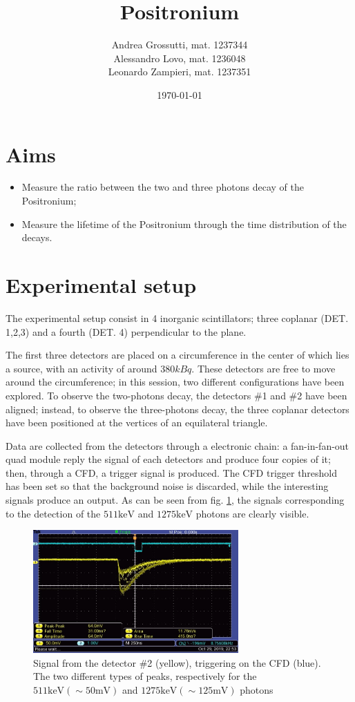\documentclass[11pt,a4 paper]{article}
\title{Positronium}
\author{Andrea Grossutti, mat. 1237344\\Alessandro Lovo, mat. 1236048\\Leonardo Zampieri, mat. 1237351}
\date{\today}
\begin{document}
\maketitle

\section{Aims}
\begin{itemize}
    \item Measure the ratio between the two and three photons decay of the Positronium;
    \item Measure the lifetime of the Positronium through the time distribution of the decays.
\end{itemize}



\section{Experimental setup}
The experimental setup consist in 4 inorganic scintillators; three coplanar (DET. 1,2,3) and a fourth (DET. 4) perpendicular to the plane.

The first three detectors are placed on a circumference in the center of which lies a  source, with an activity of around $380\si{kBq}$. These detectors are free to move around the circumference; in this session, two different configurations have been explored. To observe the two-photons decay, the detectors \#1 and \#2 have been aligned; instead, to observe the three-photons decay, the three coplanar detectors have been positioned at the vertices of an equilateral triangle.

Data are collected from the detectors through a electronic chain: a fan-in-fan-out quad module reply the signal of each detectors and produce four copies of it; then, through a CFD, a trigger signal is produced.  The CFD trigger threshold has been set so that the background noise is discarded, while the interesting signals produce an output. As can be seen from fig. \ref{fig:oscilloscope}, the signals corresponding to the detection of the $511\si{\kilo\electronvolt}$ and $1275\si{\kilo\electronvolt}$ photons are clearly visible.

\begin{figure}[H]
    \centering
    \includegraphics[width=0.7\textwidth]{img/TEK0001.JPG}
    \caption{Signal from the detector \#2 (yellow), triggering on the CFD (blue). The two different types of peaks, respectively for the $511\si{\kilo\electronvolt} (\sim 50\si{\milli\volt})$ and $1275\si{\kilo\electronvolt} (\sim 125\si{\milli\volt})$ photons}
    \label{fig:oscilloscope}
\end{figure}
\end{document}
